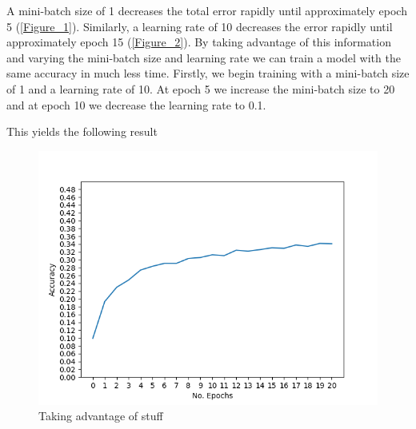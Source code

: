 A mini-batch size of 1 decreases the total error rapidly until
approximately epoch 5 (\autoref{Figure_1}).
Similarly, a learning rate of 10 decreases the error rapidly until
approximately epoch 15 (\autoref{Figure_2}).
By taking advantage of this information and varying the mini-batch size
and learning rate we can train a model with the same accuracy in much
less time. Firstly, we begin training with a mini-batch size of 1 and a
learning rate of 10. At epoch 5 we increase the mini-batch size to 20
and at epoch 10 we decrease the learning rate to 0.1.

This yields the following result

\begin{figure}[h!]
    \centering
    \includegraphics[width=\textwidth]{figures/lr_3.png}
    \caption{ 
        Taking advantage of stuff 
    }\label{Figure_3}
\end{figure}
